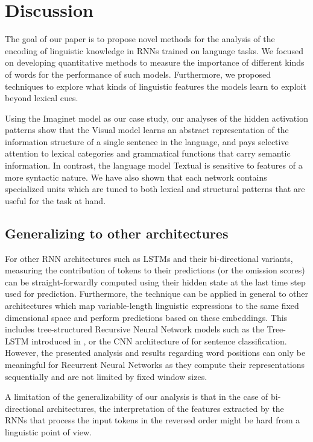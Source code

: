 \section{Discussion}
\label{sec:conclusion}

The goal of our paper is to propose novel methods for the
analysis of the encoding of linguistic knowledge in RNNs trained on language tasks.
We focused on developing quantitative methods to measure the importance
of different kinds of words for the performance of such models. Furthermore, we
proposed techniques to explore what kinds of linguistic features the models
learn to exploit beyond lexical cues.

Using the {\sc Imaginet} model as our case study,
our analyses of the hidden activation patterns show that the {\sc Visual} model
learns an abstract representation of the information structure of a single
sentence in the language, and pays selective attention to lexical categories and
grammatical functions that carry semantic information. In contrast,
the language model {\sc Textual} is sensitive to features of a more
syntactic nature. We have also shown that each network contains
specialized units which are tuned to both lexical and structural
patterns that are useful for the task at hand.


\subsection{Generalizing to other architectures}

For other RNN architectures such as LSTMs \label{edit:omitgeneral}
and their bi-directional variants, measuring the contribution
of tokens to their predictions (or the omission scores)
can be straight-forwardly computed using their hidden state
at the last time step used for prediction. Furthermore, the technique
can be applied in general to other architectures which
map variable-length linguistic expressions to the same fixed dimensional
space and perform predictions based on these embeddings.
This includes tree-structured Recursive Neural Network models such as the Tree-LSTM
introduced in \cite{kai2015treelstm}, or the CNN architecture of \cite{yoonneural2014}
for sentence classification.
However,
the presented analysis and results regarding word positions can only be meaningful
for Recurrent Neural Networks as they compute their representations sequentially and are not
limited by fixed window sizes.

A limitation of the generalizability of our
analysis is that in the case of
bi-directional architectures, the interpretation of the features
extracted by the RNNs that process the input tokens in the reversed order
might be hard from a linguistic point of view.

